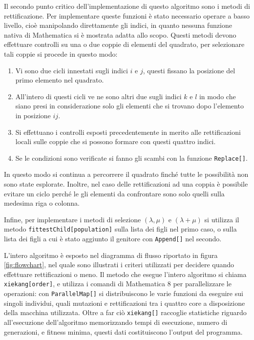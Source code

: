\documentclass[italian,twoside,twocolumn]{article}
\begin{document}
Il secondo punto critico dell'implementazione di questo algoritmo sono i metodi di rettificazione. Per implementare queste funzioni è stato necessario operare a basso livello, cioè manipolando direttamente gli indici, in quanto nessuna funzione nativa di Mathematica si è mostrata adatta allo scopo. Questi metodi devono effettuare controlli su una o due coppie di elementi del quadrato, per selezionare tali coppie si procede in questo modo: 
\begin{enumerate}
	\item Vi sono due cicli innestati sugli indici  $ i $ e $ j $, questi fissano la posizione del primo elemento nel quadrato.
	\item All'intero di questi cicli ve ne sono altri due sugli indici $ k $ e $ l $ in modo che siano presi in considerazione solo gli elementi che si trovano dopo l'elemento in posizione $ ij $.
	\item Si effettuano i controlli esposti precedentemente in merito alle rettificazioni locali sulle coppie che si possono formare con questi quattro indici.
	\item Se le condizioni sono verificate si fanno gli scambi con la funzione \texttt{Replace[]}.
\end{enumerate}
In questo modo si continua a percorrere il quadrato finché tutte le possibilità non sono state esplorate. Inoltre, nel caso delle rettificazioni ad una coppia è possibile evitare un ciclo perché le gli elementi da confrontare sono solo quelli sulla medesima riga o colonna. 

Infine, per implementare i metodi di selezione $ (\lambda, \mu) $ e $ (\lambda + \mu) $ si utilizza il metodo \texttt{fittestChild[population]} sulla lista dei figli nel primo caso, o sulla lista dei figli a cui è stato aggiunto il genitore con \texttt{Append[]} nel secondo.

L'intero algoritmo è esposto nel diagramma di flusso riportato in figura \ref{fig:flowchart}, nel quale sono illustrati i criteri utilizzati per decidere quando effettuare rettificazioni o meno. Il metodo che esegue l'intero algoritmo si chiama \texttt{xiekang[order]}, e utilizza i comandi di Mathematica 8 per parallelizzare le operazioni: con \texttt{ParallelMap[]} si distribuiscono le varie funzioni da eseguire sui singoli individui, quali mutazioni e rettificazioni tra i quattro core a disposizione della macchina utilizzata. Oltre a far ciò \texttt{xiekang[]} raccoglie statistiche riguardo all'esecuzione dell'algoritmo memorizzando tempi di esecuzione, numero di generazioni, e fitness minima, questi dati costituiscono l'output del programma.
\end{document}
